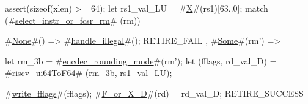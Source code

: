 assert(sizeof(xlen) >= 64);
let rs1_val_LU = #\hyperref[sailRISCVzX]{X}#(rs1)[63..0];
match (#\hyperref[sailRISCVzselectzyinstrzyorzyfcsrzyrm]{select\_instr\_or\_fcsr\_rm}# (rm)) {
  #\hyperref[sailRISCVzNone]{None}#() => { #\hyperref[sailRISCVzhandlezyillegal]{handle\_illegal}#(); RETIRE_FAIL },
  #\hyperref[sailRISCVzSome]{Some}#(rm') => {
    let rm_3b = #\hyperref[sailRISCVzencdeczyroundingzymode]{encdec\_rounding\_mode}#(rm');
    let (fflags, rd_val_D) = #\hyperref[sailRISCVzriscvzyui64ToF64]{riscv\_ui64ToF64}# (rm_3b, rs1_val_LU);

    #\hyperref[sailRISCVzwritezyfflags]{write\_fflags}#(fflags);
    #\hyperref[sailRISCVzFzyorzyXzyD]{F\_or\_X\_D}#(rd) = rd_val_D;
    RETIRE_SUCCESS
  }
}
